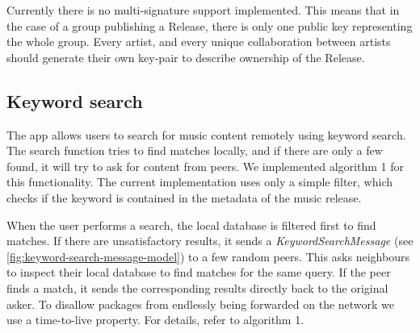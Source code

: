 Currently there is no multi-signature support implemented. This means that in the case of a group publishing a Release, there is only one public key representing the whole group. Every artist, and every unique collaboration between artists should generate their own key-pair to describe ownership of the Release.


\subsection{Keyword search}
\label{sec:searching-musiccommunity-impl}
The app allows users to search for music content remotely using keyword search. The search function tries to find matches locally, and if there are only a few found, it will try to ask for content from peers. We implemented algorithm 1 for this functionality. The current implementation uses only a simple filter, which checks if the keyword is contained in the metadata of the music release.

When the user performs a search, the local database is filtered first to find matches. If there are unsatisfactory results, it sends a \textit{KeywordSearchMessage} (see \ref{fig:keyword-search-message-model}) to a few random peers. This asks neighbours to inspect their local database to find matches for the same query. If the peer finds a match, it sends the corresponding results directly back to the original asker. To disallow packages from endlessly being forwarded on the network we use a time-to-live property. For details, refer to algorithm 1.

